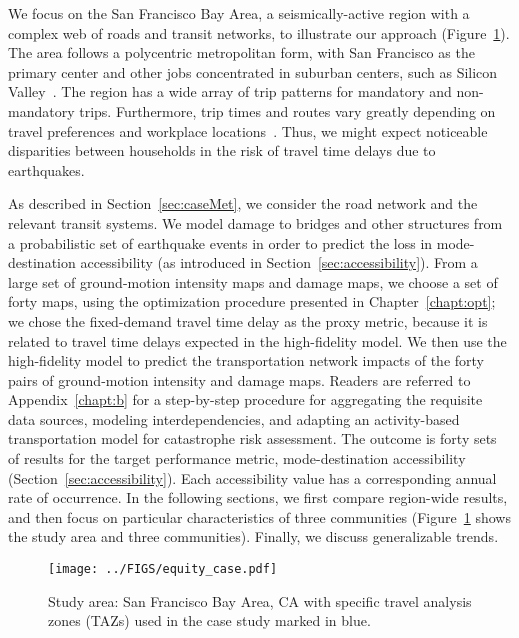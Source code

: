 We focus on the San Francisco Bay Area, a seismically-active region with a complex web of roads and transit networks, to illustrate our approach (Figure~\ref{fig:equity_study_area}). The area follows a polycentric metropolitan form, with San Francisco as the primary center and other jobs  concentrated in suburban centers, such as Silicon Valley~\cite{cervero_polycentrism_1997}. The region has a wide array of trip patterns for mandatory and non-mandatory trips. Furthermore, trip times and routes vary greatly depending on travel preferences and workplace locations~\cite{cervero_polycentrism_1997}. Thus,  we might expect noticeable disparities between households in the risk of travel time delays due to earthquakes. 


As described in Section~\ref{sec:caseMet}, we consider the road network and the relevant transit systems. We  model damage to bridges and other structures from a probabilistic set of earthquake events in order to predict the loss in mode-destination accessibility (as introduced in Section~\ref{sec:accessibility}).
From a large set of ground-motion intensity maps and damage maps, we choose a set of forty maps, using the optimization procedure presented in Chapter~\ref{chapt:opt}; we chose the fixed-demand travel time delay as the proxy metric, because it is related to travel time delays expected in the high-fidelity model. We then use the high-fidelity model to predict the transportation network impacts of the forty pairs of ground-motion intensity and damage maps. Readers are referred to Appendix~\ref{chapt:b} for a step-by-step procedure for aggregating the requisite data sources, modeling interdependencies, and adapting an activity-based transportation model for catastrophe risk assessment. The outcome is forty sets of results for the target performance metric, mode-destination accessibility (Section~\ref{sec:accessibility}). Each accessibility value has a corresponding annual rate of occurrence.
In the following sections, we first compare region-wide results, and then focus on particular characteristics of three communities (Figure~\ref{fig:equity_study_area} shows the study area and three communities). Finally, we discuss generalizable trends.
\begin{figure}
\centering
\texttt{[image: ../FIGS/equity\_case.pdf]} 
\caption{Study area: San Francisco Bay Area, CA with specific travel analysis zones (TAZs) used in the case study marked in blue.}
\label{fig:equity_study_area}
\end{figure}

